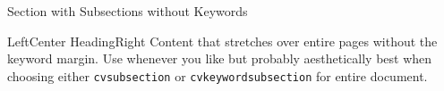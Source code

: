 \documentclass[a4paper]{mcdowellcv}
\begin{document}
    \begin{cvsection}{Section with Subsections without Keywords}
        \begin{cvsubsection}{Left}{Center Heading}{Right}
            Content that stretches over entire pages without the keyword margin. Use whenever you like but probably aesthetically best when choosing either \texttt{cvsubsection} or \texttt{cvkeywordsubsection} for entire document.
            
        \end{cvsubsection}
                   
    \end{cvsection}
\end{document}
